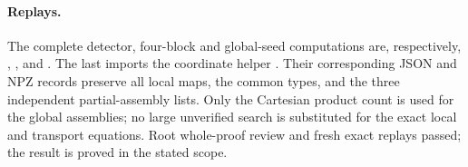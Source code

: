 \paragraph{Replays.}
The complete detector, four-block and global-seed computations
are, respectively,
,
,
and
.
The last imports the coordinate helper
.
Their corresponding JSON and NPZ records preserve all
local maps, the common types, and the three independent
partial-assembly lists. Only the Cartesian product count is
used for the global assemblies; no large unverified search
is substituted for the exact local and transport equations.
Root whole-proof review and fresh exact replays passed; the result is proved in the stated scope.

